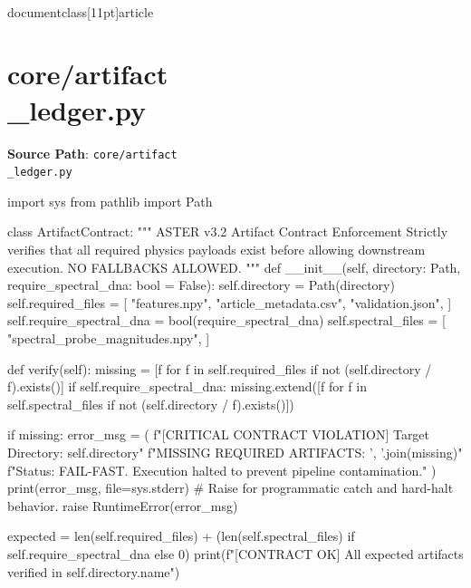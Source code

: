 \\documentclass[11pt]{article}
\begin{document}
\section*{core/artifact\\_ledger.py}
\textbf{Source Path}: \texttt{core/artifact\\_ledger.py}\par
\bigskip
\begin{CodeBlock}
import sys
from pathlib import Path

class ArtifactContract:
    """
    ASTER v3.2 Artifact Contract Enforcement
    Strictly verifies that all required physics payloads exist before allowing 
    downstream execution. NO FALLBACKS ALLOWED.
    """
    def __init__(self, directory: Path, require_spectral_dna: bool = False):
        self.directory = Path(directory)
        self.required_files = [
            "features.npy",
            "article_metadata.csv",
            "validation.json",
        ]
        self.require_spectral_dna = bool(require_spectral_dna)
        self.spectral_files = [
            "spectral_probe_magnitudes.npy",
        ]

    def verify(self):
        missing = [f for f in self.required_files if not (self.directory / f).exists()]
        if self.require_spectral_dna:
            missing.extend([f for f in self.spectral_files if not (self.directory / f).exists()])
        
        if missing:
            error_msg = (
                f"[CRITICAL CONTRACT VIOLATION] Target Directory: {self.directory}\n"
                f"MISSING REQUIRED ARTIFACTS: {', '.join(missing)}\n"
                f"Status: FAIL-FAST. Execution halted to prevent pipeline contamination."
            )
            print(error_msg, file=sys.stderr)
            # Raise for programmatic catch and hard-halt behavior.
            raise RuntimeError(error_msg)
        
        expected = len(self.required_files) + (len(self.spectral_files) if self.require_spectral_dna else 0)
        print(f"[CONTRACT OK] All {expected} artifacts verified in {self.directory.name}")

\end{CodeBlock}
\end{document}
